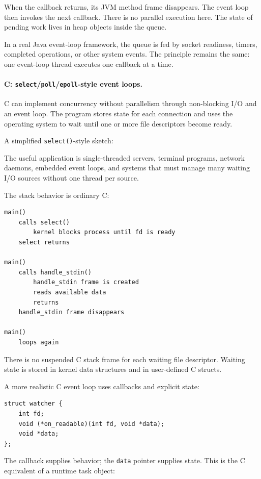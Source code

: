 When the callback returns, its JVM method frame disappears. The event loop then invokes the next callback. There is no parallel execution here. The state of pending work lives in heap objects inside the queue.

In a real Java event-loop framework, the queue is fed by socket readiness, timers, completed operations, or other system events. The principle remains the same: one event-loop thread executes one callback at a time.

\paragraph{C: \texttt{select}/\texttt{poll}/\texttt{epoll}-style event loops.}

C can implement concurrency without parallelism through non-blocking I/O and an event loop. The program stores state for each connection and uses the operating system to wait until one or more file descriptors become ready.

A simplified \texttt{select()}-style sketch:

The useful application is single-threaded servers, terminal programs, network daemons, embedded event loops, and systems that must manage many waiting I/O sources without one thread per source.

The stack behavior is ordinary C:

\begin{verbatim}
main()
    calls select()
        kernel blocks process until fd is ready
    select returns

main()
    calls handle_stdin()
        handle_stdin frame is created
        reads available data
        returns
    handle_stdin frame disappears

main()
    loops again
\end{verbatim}

There is no suspended C stack frame for each waiting file descriptor. Waiting state is stored in kernel data structures and in user-defined C structs.

A more realistic C event loop uses callbacks and explicit state:

\begin{verbatim}
struct watcher {
    int fd;
    void (*on_readable)(int fd, void *data);
    void *data;
};
\end{verbatim}

The callback supplies behavior; the \texttt{data} pointer supplies state. This is the C equivalent of a runtime task object:

